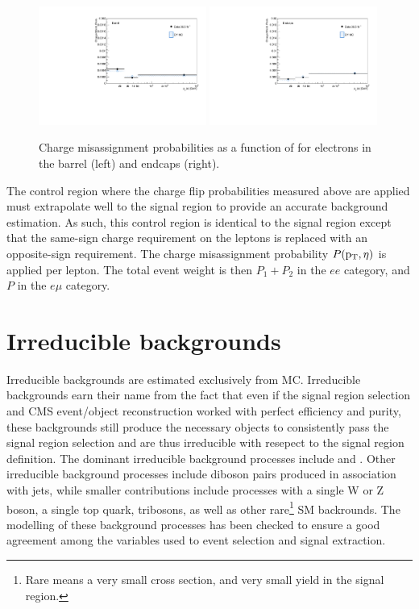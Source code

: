 \begin{figure}[htp]
\centering
\includegraphics[width=0.49\textwidth]{ch8_figs/chmid_prob_barrel.pdf}
\includegraphics[width=0.49\textwidth]{ch8_figs/chmid_prob_endcap.pdf}\\
\caption[Electron charge misassignment probabilities in data and MC.]{Charge misassignment probabilities as a function of \pt for electrons in the barrel (left) and endcaps (right).}
\label{fig:fliprate}
\end{figure}
 
The control region where the charge flip probabilities measured above are applied must extrapolate well to the signal region to provide an accurate background estimation. As such, this control region
is identical to the signal region except that the same-sign charge requirement on the leptons is replaced with an opposite-sign requirement.
The charge misassignment probability $P(\mathrm{p}_{\mathrm{T}},\eta)$ is applied per lepton. The total event weight is then $P_{1} + P_{2}$ in the $ee$ category, and $P$ in the $e\mu$ category.  

\section{Irreducible backgrounds}
Irreducible backgrounds are estimated exclusively from MC. Irreducible backgrounds earn their name from the fact that even if the signal region selection and CMS event/object reconstruction
worked with perfect efficiency and purity, these backgrounds still produce the necessary objects to consistently pass the signal region selection and are thus irreducible with resepect to the signal
region definition. The dominant irreducible background processes include \ttw and \ttz. Other irreducible background processes include diboson pairs produced in association with jets,
while smaller contributions include processes with a single W or Z boson, a single top quark, tribosons, as well as other rare\footnote{Rare means a very small cross section, and very
small yield in the signal region.} SM backrounds. The modelling of these background processes has been checked to ensure a good agreement among the variables used to event selection and
signal extraction.  

